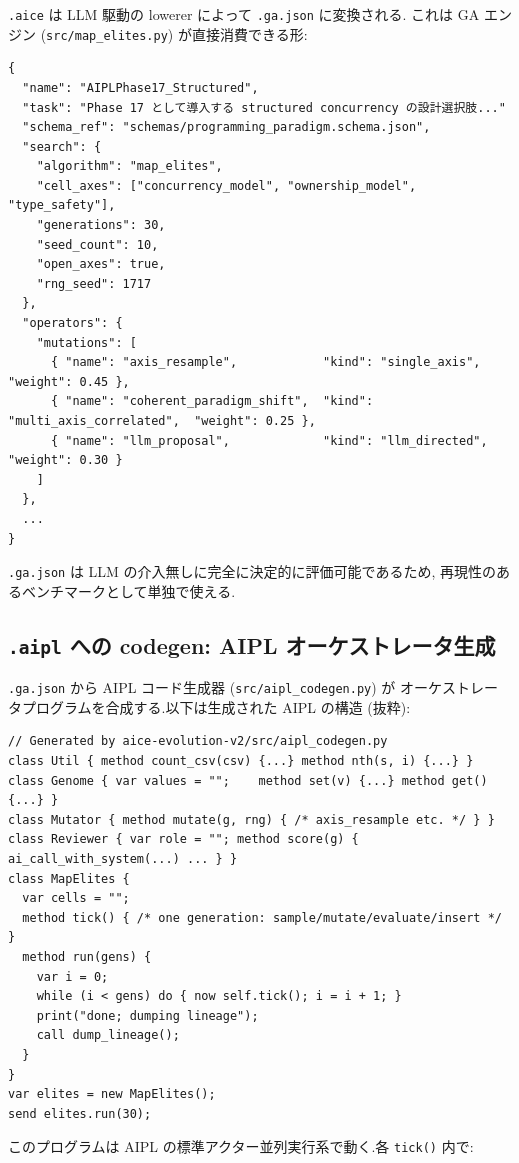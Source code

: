 \documentclass[11pt,a4paper]{article}
\newcommand{\code}[1]{\texttt{\small #1}}
\begin{document}
\code{.aice} は LLM 駆動の lowerer によって \code{.ga.json} に変換される.
これは GA エンジン (\code{src/map\_elites.py}) が直接消費できる形:

\begin{lstlisting}[language=aipl, basicstyle=\ttfamily\footnotesize]
{
  "name": "AIPLPhase17_Structured",
  "task": "Phase 17 として導入する structured concurrency の設計選択肢..."
  "schema_ref": "schemas/programming_paradigm.schema.json",
  "search": {
    "algorithm": "map_elites",
    "cell_axes": ["concurrency_model", "ownership_model", "type_safety"],
    "generations": 30,
    "seed_count": 10,
    "open_axes": true,
    "rng_seed": 1717
  },
  "operators": {
    "mutations": [
      { "name": "axis_resample",            "kind": "single_axis",            "weight": 0.45 },
      { "name": "coherent_paradigm_shift",  "kind": "multi_axis_correlated",  "weight": 0.25 },
      { "name": "llm_proposal",             "kind": "llm_directed",           "weight": 0.30 }
    ]
  },
  ...
}
\end{lstlisting}

\code{.ga.json} は LLM の介入無しに完全に決定的に評価可能であるため,
再現性のあるベンチマークとして単独で使える.

\subsection{\code{.aipl} への codegen: AIPL オーケストレータ生成}

\code{.ga.json} から AIPL コード生成器 (\code{src/aipl\_codegen.py}) が
オーケストレータプログラムを合成する.以下は生成された AIPL の構造
(抜粋):

\begin{lstlisting}
// Generated by aice-evolution-v2/src/aipl_codegen.py
class Util { method count_csv(csv) {...} method nth(s, i) {...} }
class Genome { var values = "";    method set(v) {...} method get() {...} }
class Mutator { method mutate(g, rng) { /* axis_resample etc. */ } }
class Reviewer { var role = ""; method score(g) { ai_call_with_system(...) ... } }
class MapElites {
  var cells = "";
  method tick() { /* one generation: sample/mutate/evaluate/insert */ }
  method run(gens) {
    var i = 0;
    while (i < gens) do { now self.tick(); i = i + 1; }
    print("done; dumping lineage");
    call dump_lineage();
  }
}
var elites = new MapElites();
send elites.run(30);
\end{lstlisting}

このプログラムは AIPL の標準アクター並列実行系で動く.各 \code{tick()}
内で:
\end{document}

